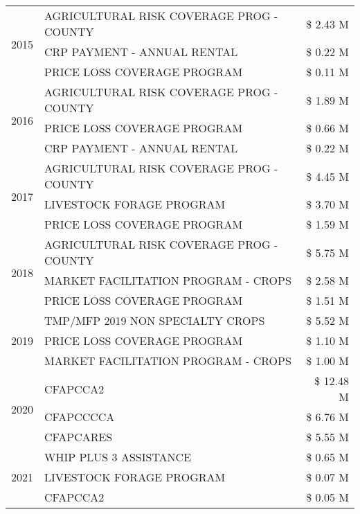 \begin{tabular}{llr}
\cline{1-3}
\multirow[t]{3}{*}{2015} & AGRICULTURAL RISK COVERAGE PROG - COUNTY & \$ 2.43 M \\
 & CRP PAYMENT - ANNUAL RENTAL & \$ 0.22 M \\
 & PRICE LOSS COVERAGE PROGRAM & \$ 0.11 M \\
\cline{1-3}
\multirow[t]{3}{*}{2016} & AGRICULTURAL RISK COVERAGE PROG - COUNTY & \$ 1.89 M \\
 & PRICE LOSS COVERAGE PROGRAM & \$ 0.66 M \\
 & CRP PAYMENT - ANNUAL RENTAL & \$ 0.22 M \\
\cline{1-3}
\multirow[t]{3}{*}{2017} & AGRICULTURAL RISK COVERAGE PROG - COUNTY & \$ 4.45 M \\
 & LIVESTOCK FORAGE PROGRAM & \$ 3.70 M \\
 & PRICE LOSS COVERAGE PROGRAM & \$ 1.59 M \\
\cline{1-3}
\multirow[t]{3}{*}{2018} & AGRICULTURAL RISK COVERAGE PROG - COUNTY & \$ 5.75 M \\
 & MARKET FACILITATION PROGRAM - CROPS & \$ 2.58 M \\
 & PRICE LOSS COVERAGE PROGRAM & \$ 1.51 M \\
\cline{1-3}
\multirow[t]{3}{*}{2019} & TMP/MFP 2019 NON SPECIALTY CROPS & \$ 5.52 M \\
 & PRICE LOSS COVERAGE PROGRAM & \$ 1.10 M \\
 & MARKET FACILITATION PROGRAM - CROPS & \$ 1.00 M \\
\cline{1-3}
\multirow[t]{3}{*}{2020} & CFAPCCA2 & \$ 12.48 M \\
 & CFAPCCCCA & \$ 6.76 M \\
 & CFAPCARES & \$ 5.55 M \\
\cline{1-3}
\multirow[t]{3}{*}{2021} & WHIP PLUS 3 ASSISTANCE & \$ 0.65 M \\
 & LIVESTOCK FORAGE PROGRAM & \$ 0.07 M \\
 & CFAPCCA2 & \$ 0.05 M \\
\cline{1-3}
\bottomrule
\end{tabular}

